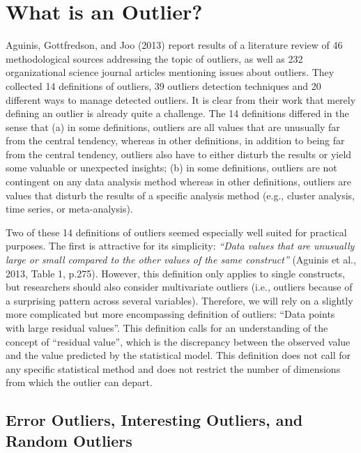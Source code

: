 \documentclass[man,floatsintext]{apa6}
\begin{document}
\hypertarget{what-is-an-outlier}{%
\section{What is an Outlier?}\label{what-is-an-outlier}}

Aguinis, Gottfredson, and Joo (2013) report results of a literature review of 46 methodological sources addressing the topic of outliers, as well as 232 organizational science journal articles mentioning issues about outliers. They collected 14 definitions of outliers, 39 outliers detection techniques and 20 different ways to manage detected outliers. It is clear from their work that merely defining an outlier is already quite a challenge. The 14 definitions differed in the sense that (a) in some definitions, outliers are all values that are unusually far from the central tendency, whereas in other definitions, in addition to being far from the central tendency, outliers also have to either disturb the results or yield some valuable or unexpected insights; (b) in some definitions, outliers are not contingent on any data analysis method whereas in other definitions, outliers are values that disturb the results of a specific analysis method (e.g., cluster analysis, time series, or meta-analysis).

Two of these 14 definitions of outliers seemed especially well suited for practical purposes. The first is attractive for its simplicity: \emph{\enquote{Data values that are unusually large or small compared to the other values of the same construct}} (Aguinis et al., 2013, Table 1, p.275). However, this definition only applies to single constructs, but researchers should also consider multivariate outliers (i.e., outliers because of a surprising pattern across several variables). Therefore, we will rely on a slightly more complicated but more encompassing definition of outliers: \enquote{Data points with large residual values}. This definition calls for an understanding of the concept of \enquote{residual value}, which is the discrepancy between the observed value and the value predicted by the statistical model. This definition does not call for any specific statistical method and does not restrict the number of dimensions from which the outlier can depart.

\hypertarget{error-outliers-interesting-outliers-and-random-outliers}{%
\subsection{Error Outliers, Interesting Outliers, and Random Outliers}\label{error-outliers-interesting-outliers-and-random-outliers}}
\end{document}
